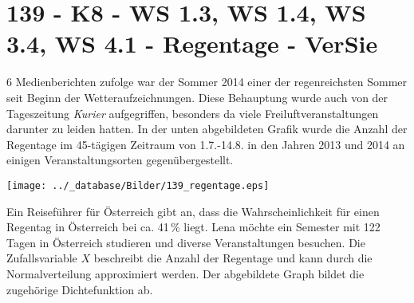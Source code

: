 \section{139 - K8 - WS 1.3, WS 1.4, WS 3.4, WS 4.1 - Regentage - VerSie}

\begin{langesbeispiel} \item[6] %
Medienberichten zufolge war der Sommer 2014 einer der regenreichsten Sommer seit Beginn der Wetteraufzeichnungen. Diese Behauptung wurde auch von der Tageszeitung \textit{Kurier} aufgegriffen, besonders da viele Freiluftveranstaltungen darunter zu leiden hatten. In der unten abgebildeten Grafik wurde die Anzahl der Regentage im 45-tägigen Zeitraum von 1.7.-14.8. in den Jahren 2013 und 2014 an einigen Veranstaltungsorten gegenübergestellt.

\begin{center}
\texttt{[image: ../\_database/Bilder/139\_regentage.eps]}
\end{center}%

\begin{aufgabenstellung}
\item %


\item %


\item Ein Reiseführer für Österreich gibt an, dass die Wahrscheinlichkeit für einen Regentag in Österreich bei ca. 41\,\% liegt. Lena möchte ein Semester mit 122 Tagen in Österreich studieren und diverse Veranstaltungen besuchen. Die Zufallsvariable $X$ beschreibt die Anzahl der Regentage und kann durch die Normalverteilung approximiert werden. Der abgebildete Graph bildet die zugehörige Dichtefunktion ab.
	

\end{aufgabenstellung}
\end{langesbeispiel}
